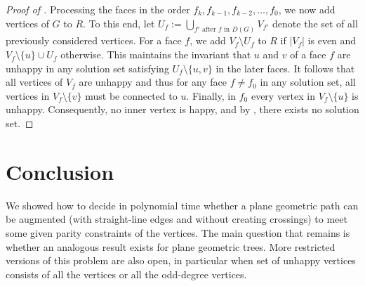 \documentclass[a4paper,runningheads,cleveref,thm-restate]{lipics-v2021}
\newcommand{\hset}{solution set\xspace}
\begin{document}
\begin{proof} [Proof of ]
	Processing the faces in the order $f_k,f_{k-1}, f_{k-2},\dots, f_0$, we now add vertices of $G$ to $R$.
	To this end, let $U_f:=\bigcup_{f' \text{ after $f$ in $D(G)$}} V_{f'}$ denote the set of all previously considered vertices. 
	For a face $f$, we add $V_{f}\setminus U_f$ to $R$ if $|V_{f}|$ is even and $V_{f} \setminus \{u\}\cup U_f$ otherwise. 
	This maintains the invariant that $u$ and $v$ of a face $f$ are unhappy in any \hset satisfying $U_f\setminus \{u,v\}$ in the later faces. 
	It follows that all vertices of $V_f$ are unhappy and thus for any face $f\neq f_0$ in any \hset, all vertices in $V_{f} \setminus \{v\}$ must be connected to $u$. 
	Finally, in $f_0$ every vertex in $V_f\setminus \{u\}$ is unhappy. 
	Consequently, no inner vertex is happy, and by , there exists no \hset.
\end{proof}


\section{Conclusion}

We showed how to decide in polynomial time whether a plane geometric path can be augmented (with straight-line edges and without creating crossings) to meet some given parity constraints of the vertices. The main question that remains is whether an analogous result exists for plane geometric trees. More restricted versions of this problem are also open, in particular when set of unhappy vertices consists of all the vertices or all the odd-degree vertices. 





\end{document}
